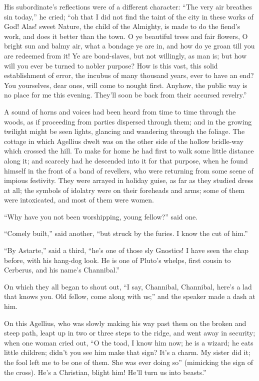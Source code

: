 His subordinate's reflections were of a different character:
``The very air breathes sin today,'' he cried; ``oh that I
did not find the taint of the city in these works of God! Alas! sweet
Nature, the child of the Almighty, is made to do the fiend's work, and
does it better than the town. O ye beautiful trees and fair flowers, O
bright sun and balmy air, what a bondage ye are in, and how do ye
groan till you are redeemed from it! Ye are bond-slaves, but not
willingly, as man is; but how will you ever be turned to nobler
purpose? How is this vast, this solid establishment of error, the
incubus of many thousand years, ever to have an end? You yourselves,
dear ones, will come to nought first. Anyhow, the public way is no
place for me this evening. They'll soon be back from their accursed
revelry.''

A sound of horns and voices had been heard from time to time
through the woods, as if proceeding from parties dispersed through
them; and in the growing twilight might be seen lights, glancing and
wandering through the foliage. The cottage in which Agellius dwelt was
on the other side of the hollow bridle-way which crossed the hill. To
make for home he had first to walk some little distance along it; and
scarcely had he descended into it for that purpose, when he found
himself in the front of a band of revellers, who were returning from
some scene of impious festivity. They were arrayed in holiday guise,
as far as they studied dress at all; the symbols of idolatry were on
their foreheads and arms; some of them were intoxicated, and most
of them were women.

``Why have you not been worshipping, young fellow?'' said
one.

``Comely built,'' said another, ``but struck by the
furies. I know the cut of him.''

``By Astarte,'' said a third, ``he's one of those sly
Gnostics! I have seen the chap before, with his hang-dog look. He is
one of Pluto's whelps, first cousin to Cerberus, and his name's
Channibal.''

On which they all began to shout out, ``I say, Channibal,
Channibal, here's a lad that knows you. Old fellow, come along with
us;'' and the speaker made a dash at him.

On this Agellius, who was slowly making his way past them on the
broken and steep path, leapt up in two or three steps to the ridge,
and went away in security; when one woman cried out, ``O the toad,
I know him now; he is a wizard; he eats little children; didn't you
see him make that sign? It's a charm. My sister did it; the fool left
me to be one of them. She was ever doing so'' (mimicking the sign
of the cross). He's a Christian, blight him! He'll turn us into
beasts.''

